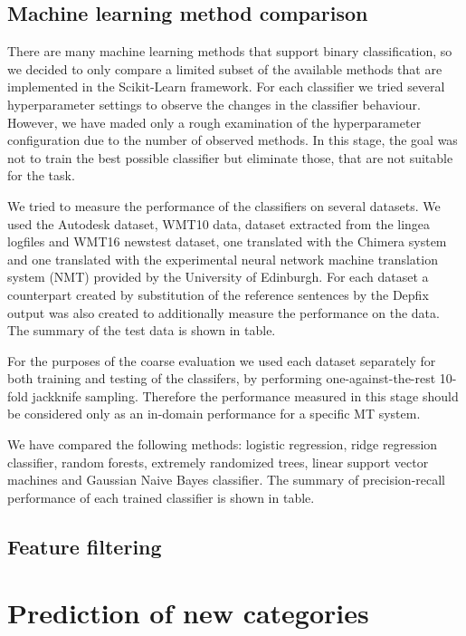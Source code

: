 \subsection{Machine learning method comparison}

There are many machine learning methods that support binary classification, so we
decided to only compare a limited subset of the available methods that are implemented
in the Scikit-Learn framework. For each classifier we tried several hyperparameter
settings to observe the changes in the classifier behaviour. However, we have maded only
a rough examination of the hyperparameter configuration due to the number of observed
methods. In this stage, the goal was not to train the best possible classifier but
eliminate those, that are not suitable for the task.

We tried to measure the performance of the classifiers on several datasets. We used
the Autodesk dataset, WMT10 data, dataset extracted from the lingea logfiles and
WMT16 newstest dataset, one translated with the Chimera system and
one translated with the experimental neural network machine translation system (NMT)
provided by the University of Edinburgh. For each dataset a counterpart
created by substitution of the reference sentences by the Depfix output was also created
to additionally measure the performance on the  data. The summary of the
test data is shown in table.

For the purposes of the coarse evaluation we used each dataset separately for both training
and testing of the classifers, by performing one-against-the-rest 10-fold jackknife sampling.
Therefore the performance measured in this stage should be considered only as an in-domain
performance for a specific MT system.

We have compared the following methods: logistic regression, ridge regression classifier,
random forests, extremely randomized trees, linear support vector machines and Gaussian Naive Bayes
classifier. The summary of precision-recall performance of each trained classifier is shown
in table.


\subsection{Feature filtering}



\section{Prediction of new categories}

